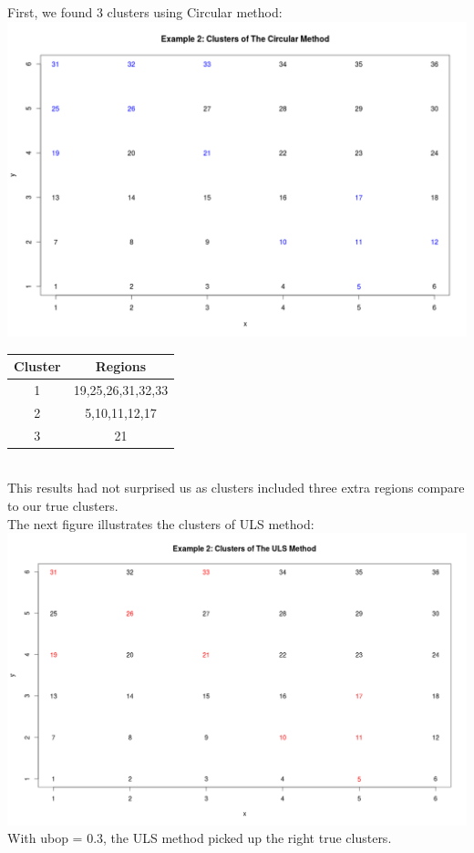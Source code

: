 \documentclass[12pt]{article}
\begin{document}
First, we found 3 clusters using Circular method:\\
\includegraphics[scale=0.2]{Ex2:Circular} \\

\hspace{4cm}\begin{tabular}{|c|c|}
	\hline
	Cluster & Regions \\
	\hline
	1 & 19,25,26,31,32,33 \\
	2 & 5,10,11,12,17 \\ 
	3 & 21 \\ \hline
\end{tabular} \\

This results had not surprised us as clusters included three extra regions compare to our true clusters.\\

The next figure illustrates the clusters of ULS method: \\ 
\includegraphics[scale=0.2]{Ex2:ULS}\\
With ubop = 0.3, the ULS method picked up the right true clusters.\\
\end{document}
